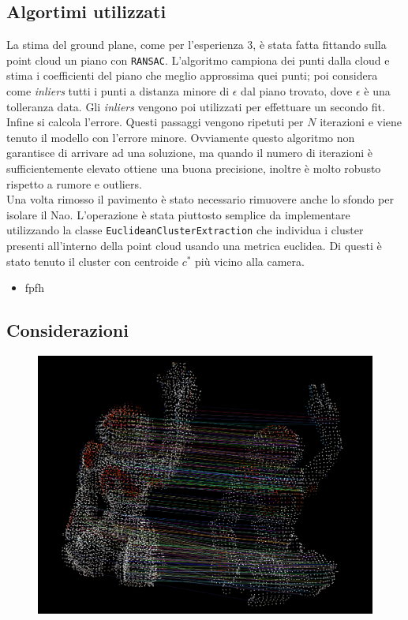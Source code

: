 \documentclass[a4paper]{article}
\begin{document}
	\subsection{Algortimi utilizzati} \label{sec:lab4_alg}
	La stima del ground plane, come per l'esperienza 3, è stata fatta fittando sulla point cloud un piano con \verb|RANSAC|. L'algoritmo campiona dei punti dalla cloud e stima i coefficienti del piano che meglio approssima quei punti; poi considera come \textit{inliers} tutti i punti a distanza minore di $\epsilon$ dal piano trovato, dove $\epsilon$ è una tolleranza data. Gli \textit{inliers} vengono poi utilizzati per effettuare un secondo fit. Infine si calcola l'errore. Questi passaggi vengono ripetuti per $N$ iterazioni e viene tenuto il modello con l'errore minore. Ovviamente questo algoritmo non garantisce di arrivare ad una soluzione, ma quando il numero di iterazioni è sufficientemente elevato ottiene una buona precisione, inoltre è molto robusto rispetto a rumore e outliers. \\
	Una volta rimosso il pavimento è stato necessario rimuovere anche lo sfondo per isolare il Nao. L'operazione è stata piuttosto semplice da implementare utilizzando la classe \verb|EuclideanClusterExtraction| che individua i cluster presenti all'interno della point cloud usando una metrica euclidea. Di questi è stato tenuto il cluster con centroide $c^*$ più vicino alla camera. \\
	
	\begin{itemize}
		\item fpfh
	\end{itemize}


	\subsection{Considerazioni} \label{sec:lab4_disc}
	
	
	\begin{figure}
		\centering
		\includegraphics[width=1\textwidth]{images/lab4_nao_correspondences.png}
		\caption{\label{fig:lab4_nao_correspondences}}
	\end{figure}
\end{document}
